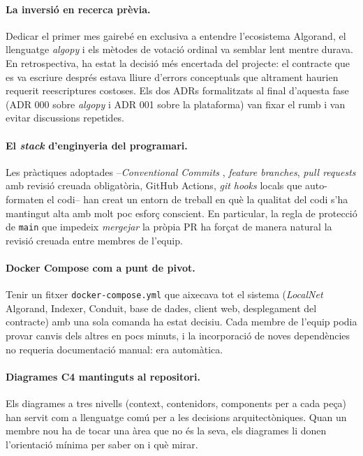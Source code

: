 \paragraph{La inversió en recerca prèvia.} Dedicar el primer mes
gairebé en exclusiva a entendre l'ecosistema Algorand, el llenguatge
\emph{algopy} i els mètodes de votació ordinal va semblar lent
mentre durava. En retrospectiva, ha estat la decisió més encertada
del projecte: el contracte que es va escriure després estava lliure
d'errors conceptuals que altrament haurien requerit reescriptures
costoses. Els dos \acp{ADR} formalitzats al final d'aquesta fase
(\acl{ADR} 000 sobre \emph{algopy} i \acl{ADR} 001 sobre la
plataforma) van fixar el rumb i van evitar discussions repetides.

\paragraph{El \emph{stack} d'enginyeria del programari.} Les
pràctiques adoptades --\emph{Conventional Commits}
\cite{conventionalcommits}, \emph{feature branches}, \emph{pull
requests} amb revisió creuada obligatòria, GitHub Actions, \emph{git
hooks} locals que auto-formaten el codi-- han creat un entorn de
treball en què la qualitat del codi s'ha mantingut alta amb molt poc
esforç conscient. En particular, la regla de protecció de
\texttt{main} que impedeix \emph{mergejar} la pròpia \ac{PR} ha
forçat de manera natural la revisió creuada entre membres de
l'equip.

\paragraph{Docker Compose com a punt de pivot.} Tenir un fitxer
\texttt{docker-compose.yml} que aixecava tot el sistema (\emph{LocalNet}
Algorand, Indexer, Conduit, base de dades, client web, desplegament del
contracte) amb una sola comanda ha estat decisiu. Cada membre de
l'equip podia provar canvis dels altres en pocs minuts, i la
incorporació de noves dependències no requeria documentació
manual: era automàtica.

\paragraph{Diagrames C4 \cite{brown2018c4} mantinguts al repositori.}
Els diagrames a tres nivells (context, contenidors, components per a
cada peça) han servit com a llenguatge comú per a les decisions
arquitectòniques. Quan un membre nou ha de tocar una àrea que no és
la seva, els diagrames li donen l'orientació mínima per saber on i
què mirar.

